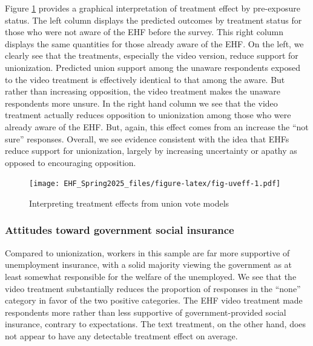 \documentclass[
  11pt,
  oneside]{article}
\begin{document}
Figure \ref{fig:fig-uveff} provides a graphical interpretation of treatment effect by pre-exposure status. The left column displays the predicted outcomes by treatment status for those who were not aware of the EHF before the survey. This right column displays the same quantities for those already aware of the EHF. On the left, we clearly see that the treatments, especially the video version, reduce support for unionization. Predicted union support among the unaware respondents exposed to the video treatment is effectively identical to that among the aware. But rather than increasing opposition, the video treatment makes the unaware respondents more unsure. In the right hand column we see that the video treatment actually reduces opposition to unionization among those who were already aware of the EHF. But, again, this effect comes from an increase the ``not sure'' responses. Overall, we see evidence consistent with the idea that EHFs reduce support for unionization, largely by increasing uncertainty or apathy as opposed to encouraging opposition.

\begin{figure}
\centering
\texttt{[image: EHF\_Spring2025\_files/figure-latex/fig-uveff-1.pdf]}
\caption{\label{fig:fig-uveff}Interpreting treatment effects from union vote models}
\end{figure}

\subsubsection{Attitudes toward government social insurance}\label{attitudes-toward-government-social-insurance}

Compared to unionization, workers in this sample are far more supportive of unemployment insurance, with a solid majority viewing the government as at least somewhat responsible for the welfare of the unemployed. We see that the video treatment substantially reduces the proportion of responses in the ``none'' category in favor of the two positive categories. The EHF video treatment made respondents more rather than less supportive of government-provided social insurance, contrary to expectations. The text treatment, on the other hand, does not appear to have any detectable treatment effect on average.
\end{document}
